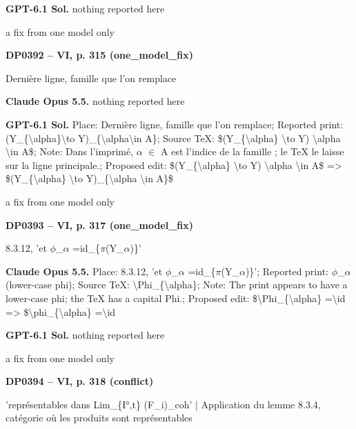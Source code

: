 \textbf{GPT-6.1 Sol.} nothing reported here\par
a fix from one model only\par
\par\noindent\hypertarget{DP0392}{}\textbf{DP0392 -- VI, p. 315 (one\_model\_fix)}\par
Dernière ligne, famille que l'on remplace\par
\textbf{Claude Opus 5.5.} nothing reported here\par
\textbf{GPT-6.1 Sol.} Place: Dernière ligne, famille que l'on remplace; Reported print: (Y\_\{\textbackslash{}alpha\}\textbackslash{}to Y)\_\{\textbackslash{}alpha\textbackslash{}in A\}; Source TeX: \$(Y\_\{\textbackslash{}alpha\} \textbackslash{}to Y) \textbackslash{}alpha \textbackslash{}in A\$; Note: Dans l'imprimé, \ensuremath{\alpha} \ensuremath{\in} A est l'indice de la famille ; le TeX le laisse sur la ligne principale.; Proposed edit: \$(Y\_\{\textbackslash{}alpha\} \textbackslash{}to Y) \textbackslash{}alpha \textbackslash{}in A\$ =\allowbreak > \$(Y\_\{\textbackslash{}alpha\} \textbackslash{}to Y)\_\{\textbackslash{}alpha \textbackslash{}in A\}\$\par
a fix from one model only\par
\par\noindent\hypertarget{DP0393}{}\textbf{DP0393 -- VI, p. 317 (one\_model\_fix)}\par
8.3.12, 'et \ensuremath{\phi}\_\ensuremath{\alpha} =\allowbreak  id\_\{\ensuremath{\pi}(Y\_\ensuremath{\alpha})\}'\par
\textbf{Claude Opus 5.5.} Place: 8.3.12, 'et \ensuremath{\phi}\_\ensuremath{\alpha} =\allowbreak  id\_\{\ensuremath{\pi}(Y\_\ensuremath{\alpha})\}'; Reported print: \ensuremath{\phi}\_\ensuremath{\alpha} (lower-case phi); Source TeX: \textbackslash{}Phi\_\{\textbackslash{}alpha\}; Note: The print appears to have a lower-case phi; the TeX has a capital Phi.; Proposed edit: \$\textbackslash{}Phi\_\{\textbackslash{}alpha\} =\allowbreak  \textbackslash{}id =\allowbreak > \$\textbackslash{}phi\_\{\textbackslash{}alpha\} =\allowbreak  \textbackslash{}id\par
\textbf{GPT-6.1 Sol.} nothing reported here\par
a fix from one model only\par
\par\noindent\hypertarget{DP0394}{}\textbf{DP0394 -- VI, p. 318 (conflict)}\par
'représentables dans Lim\_\{I°,t\} (F\_i)\_coh' | Application du lemme 8.3.4, catégorie où les produits sont représentables\par
